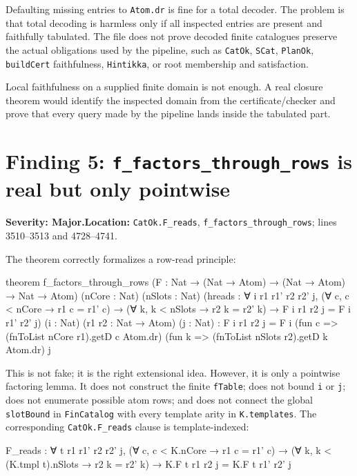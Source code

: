 \documentclass[11pt]{article}
\newcommand{\sev}[1]{\textbf{Severity: #1}}
\begin{document}
Defaulting missing entries to \texttt{Atom.dr} is fine for a total decoder. The problem is that total decoding is harmless only if all inspected entries are present and faithfully tabulated. The file does not prove decoded finite catalogues preserve the actual obligations used by the pipeline, such as \texttt{CatOk}, \texttt{SCat}, \texttt{PlanOk}, \texttt{buildCert} faithfulness, \texttt{Hintikka}, or root membership and satisfaction.

Local faithfulness on a supplied finite domain is not enough. A real closure theorem would identify the inspected domain from the certificate/checker and prove that every query made by the pipeline lands inside the tabulated part.

\section{Finding 5: \texttt{f\_factors\_through\_rows} is real but only pointwise}

\sev{Major.}\quad \textbf{Location:} \texttt{CatOk.F\_reads}, \texttt{f\_factors\_through\_rows}; lines 3510--3513 and 4728--4741.

The theorem correctly formalizes a row-read principle:

\begin{leancode}
theorem f_factors_through_rows
    (F : Nat → (Nat → Atom) → (Nat → Atom) → Nat → Atom)
    (nCore : Nat) (nSlots : Nat)
    (hreads : ∀ i r1 r1' r2 r2' j,
      (∀ c, c < nCore → r1 c = r1' c) →
      (∀ k, k < nSlots → r2 k = r2' k) →
      F i r1 r2 j = F i r1' r2' j)
    (i : Nat) (r1 r2 : Nat → Atom) (j : Nat) :
    F i r1 r2 j
      = F i (fun c => (fnToList nCore r1).getD c Atom.dr)
            (fun k => (fnToList nSlots r2).getD k Atom.dr) j
\end{leancode}

This is not fake; it is the right extensional idea. However, it is only a pointwise factoring lemma. It does not construct the finite \texttt{fTable}; does not bound \texttt{i} or \texttt{j}; does not enumerate possible atom rows; and does not connect the global \texttt{slotBound} in \texttt{FinCatalog} with every template arity in \texttt{K.templates}. The corresponding \texttt{CatOk.F\_reads} clause is template-indexed:

\begin{leancode}
F_reads : ∀ t r1 r1' r2 r2' j,
  (∀ c, c < K.nCore → r1 c = r1' c) →
  (∀ k, k < (K.tmpl t).nSlots → r2 k = r2' k) →
  K.F t r1 r2 j = K.F t r1' r2' j
\end{leancode}
\end{document}
